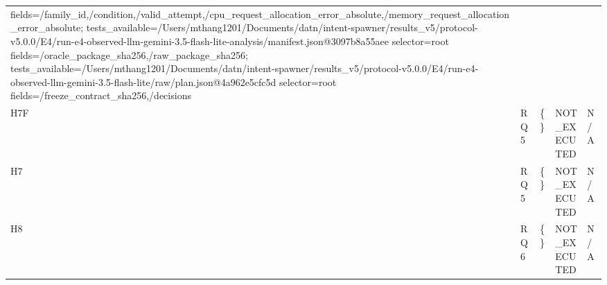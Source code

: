 \begin{tabular}{lllll}
fields=/family\_id,/condition,/valid\_attempt,/cpu\_request\_allocation\_error\_absolute,/memory\_request\_allocation\_error\_absolute; tests\_available=/Users/mthang1201/Documents/datn/intent-spawner/results\_v5/protocol-v5.0.0/E4/run-e4-observed-llm-gemini-3.5-flash-lite-analysis/manifest.json@3097b8a55aee selector=root fields=/oracle\_package\_sha256,/raw\_package\_sha256; tests\_available=/Users/mthang1201/Documents/datn/intent-spawner/results\_v5/protocol-v5.0.0/E4/run-e4-observed-llm-gemini-3.5-flash-lite/raw/plan.json@4a962e5cfc5d selector=root fields=/freeze\_contract\_sha256,/decisions \\
H7F & RQ5 & \{\} & NOT\_EXECUTED & N/A \\
H7 & RQ5 & \{\} & NOT\_EXECUTED & N/A \\
H8 & RQ6 & \{\} & NOT\_EXECUTED & N/A \\
\hline
\end{tabular}
